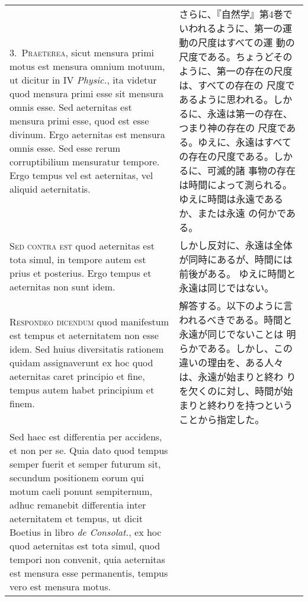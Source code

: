 \documentclass[10pt]{jsarticle} %
\begin{document}
\begin{longtable}{p{21em}p{21em}}
\\


3.~{\scshape Praeterea}, sicut mensura primi motus est mensura omnium
motuum, ut dicitur in IV {\it Physic.}, ita videtur quod mensura primi esse
sit mensura omnis esse. Sed aeternitas est mensura primi esse, quod est
esse divinum. Ergo aeternitas est mensura omnis esse. Sed esse rerum
corruptibilium mensuratur tempore. Ergo tempus vel est aeternitas, vel
aliquid aeternitatis.

&

さらに、『自然学』第4巻でいわれるように、第一の運動の尺度はすべての運
動の尺度である。ちょうどそのように、第一の存在の尺度は、すべての存在の
尺度であるように思われる。しかるに、永遠は第一の存在、つまり神の存在の
尺度である。ゆえに、永遠はすべての存在の尺度である。しかるに、可滅的諸
事物の存在は時間によって測られる。ゆえに時間は永遠であるか、または永遠
の何かである。

\\


{\scshape Sed contra est} quod aeternitas est tota simul, in tempore
autem est prius et posterius. Ergo tempus et aeternitas non sunt idem.

&

しかし反対に、永遠は全体が同時にあるが、時間には前後がある。
ゆえに時間と永遠は同じではない。


\\


{\scshape Respondeo dicendum} quod manifestum est tempus et aeternitatem
non esse idem. Sed huius diversitatis rationem quidam assignaverunt ex
hoc quod aeternitas caret principio et fine, tempus autem habet
principium et finem.


&

解答する。以下のように言われるべきである。時間と永遠が同じでないことは
明らかである。しかし、この違いの理由を、ある人々は、永遠が始まりと終わ
りを欠くのに対し、時間が始まりと終わりを持つということから指定した。

\\



Sed haec est differentia per accidens, et non per se. Quia dato quod
tempus semper fuerit et semper futurum sit, secundum positionem eorum
qui motum caeli ponunt sempiternum, adhuc remanebit differentia inter
aeternitatem et tempus, ut dicit Boetius in libro {\it de Consolat.}, ex
hoc quod aeternitas est tota simul, quod tempori non convenit, quia
aeternitas est mensura esse permanentis, tempus vero est mensura motus.


\end{longtable}
\end{document}
